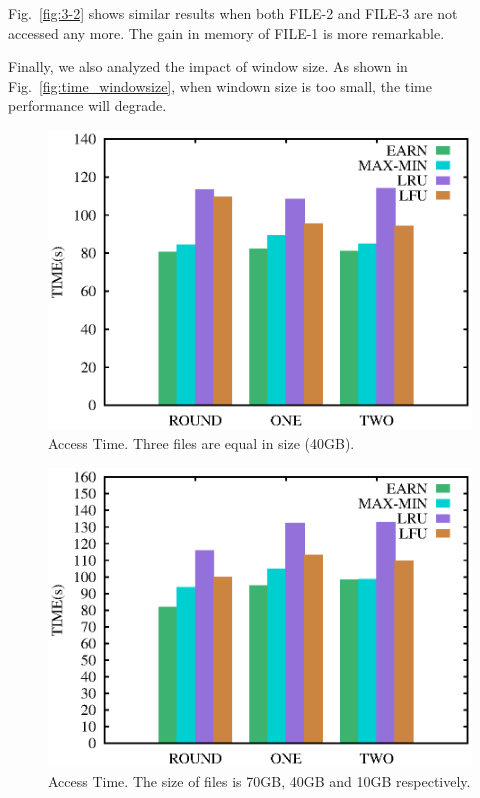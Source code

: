\documentclass[10pt,conference,letterpaper]{IEEEtran}
\begin{document}
Fig.~\ref{fig:3-2} shows similar results when both FILE-2 and FILE-3 are not accessed any more. The gain in memory of FILE-1 is more remarkable.

Finally, we also analyzed the impact of window size. As shown in Fig.~\ref{fig:time_windowsize}, when windown size is too small, the time performance will degrade.

\begin{figure}[!htbp]
\centering
\includegraphics[scale=0.4]{figures/scan444_time.eps}
\caption{Access Time. Three files are equal in size (40GB).}
\label{fig:time_444}
\end{figure}

\begin{figure}[!htbp]
\centering
\includegraphics[scale=0.4]{figures/scan741_time.eps}
\caption{Access Time. The size of files is 70GB, 40GB and 10GB respectively.}
\label{fig:time_741}
\end{figure}
\end{document}
